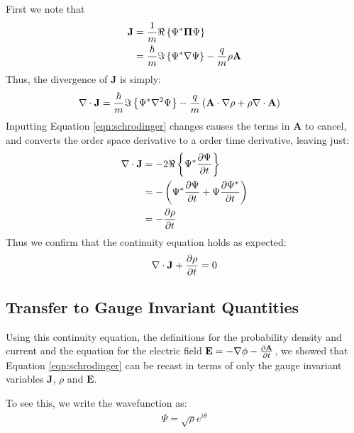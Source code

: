 First we note that
\begin{align}
    \mathbf{J} &= \frac{1}{m} \Re \left\{ \Psi^* \mathbf{\Pi} \Psi \right\} \\
               &= \frac{\hbar}{m} \Im \left\{ \Psi^* \nabla \Psi \right\} - \frac{q}{m} \rho
                    \mathbf{A}
\end{align}
Thus, the divergence of $\mathbf{J}$ is simply:
\begin{align}
    \nabla \cdot \mathbf{ J } &= \frac{\hbar}{m} \Im \left\{ \Psi^* \nabla^2 \Psi \right\} - \frac{q}{m} \left(
                \mathbf{A} \cdot \nabla \rho + \rho \nabla \cdot
                \mathbf{A} \right)
\end{align}
Inputting Equation \ref{eqn:schrodinger} changes causes the terms in
$\mathbf{A}$ to cancel, and converts the  order space
derivative to a  order time derivative, leaving just:
\begin{align}
    \nabla \cdot \mathbf{ J } &= -2 \Re \left\{ \Psi^* \frac{\partial \Psi}{\partial t} \right\} \\
            &= - \left( \Psi^* \frac{\partial \Psi}{\partial t}
               + \Psi \frac{\partial \Psi^*}{\partial t} \right) \\
            &= - \frac{\partial \rho}{\partial t}
\end{align}
Thus we confirm that the continuity equation holds as expected:
\begin{align}
    \nabla \cdot \mathbf{ J } + \frac{\partial \rho}{\partial t} = 0
    \label{eqn:continuity}
\end{align}

\subsection{Transfer to Gauge Invariant Quantities}

Using this continuity equation, the definitions for the probability density and
current and the equation for the electric field $\mathbf{E} = - \nabla \phi -
\frac{\partial \mathbf{A}}{\partial t}$, we showed that Equation \ref{eqn:schrodinger} can be recast
in terms of only the gauge invariant variables $\mathbf{J}$, $\rho$ and
$\mathbf{E}$.

To see this, we write the wavefunction as:
\begin{align}
    \Psi = \sqrt{\rho} e^{i \theta}
\end{align}
